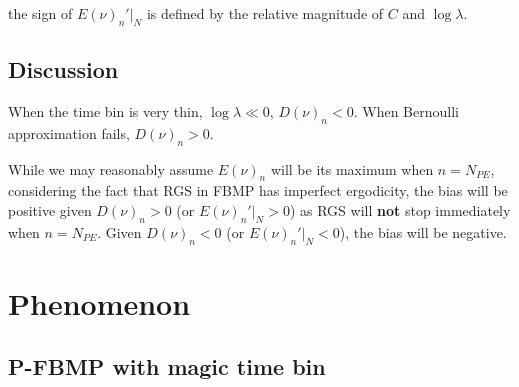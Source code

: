 \documentclass[notitlepage]{article}
\begin{document}
the sign of $E(\nu)_n'|_N$ is defined by the relative magnitude of $C$ and $\log\lambda$. 

\subsection{Discussion}

When the time bin is very thin, $\log\lambda \ll 0$, $D(\nu)_n < 0$. When Bernoulli approximation fails, $D(\nu)_n > 0$. 

While we may reasonably assume $E(\nu)_n$ will be its maximum when $n=N_{PE}$, considering the fact that RGS in FBMP has imperfect ergodicity, the bias will be positive given $D(\nu)_n > 0$ (or $E(\nu)_n'|_N > 0$) as RGS will \textbf{not} stop immediately when $n=N_{PE}$. Given $D(\nu)_n < 0$ (or $E(\nu)_n'|_N < 0$), the bias will be negative. 

\section{Phenomenon}

\subsection{P-FBMP with magic time bin}
\end{document}
